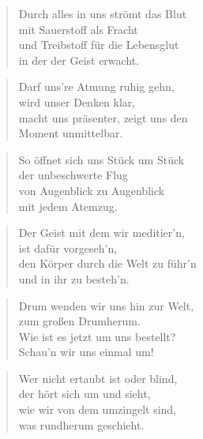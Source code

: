 \documentclass[10pt,a4paper]{article}
\begin{document}
\begin{multicols}{2}
\begin{verse}
Durch alles in uns strömt das Blut \\
mit Sauerstoff als Fracht \\
und Treibstoff für die Lebensglut \\
in der der Geist erwacht. \\
\end{verse}

\begin{verse}
Darf uns’re Atmung ruhig gehn, \\
wird unser Denken klar, \\
macht uns präsenter, zeigt uns den \\
Moment unmittelbar. \\
\end{verse}

\begin{verse}
So öffnet sich uns Stück um Stück \\
der unbeschwerte Flug \\
von Augenblick zu Augenblick \\
mit jedem Atemzug. \\
\end{verse}

\begin{verse}
Der Geist mit dem wir meditier’n, \\
ist dafür vorgeseh’n, \\
den Körper durch die Welt zu führ’n \\
und in ihr zu besteh’n. \\
\end{verse}

\begin{verse}
Drum wenden wir uns hin zur Welt, \\
zum großen Drumherum. \\
Wie ist es jetzt um uns bestellt? \\
Schau’n wir uns einmal um! \\
\end{verse}

\begin{verse}
Wer nicht ertaubt ist oder blind, \\
der hört sich um und sieht, \\
wie wir von dem umzingelt sind, \\
was rundherum geschieht. \\
\end{verse}


\end{multicols}
\end{document}
